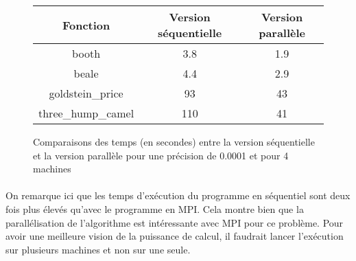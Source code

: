     \begin{figure}[!h]
        \begin{center}
            \begin{tabular}{|c|c|c|}
            \hline
                \textbf{Fonction} & \textbf{Version séquentielle} & \textbf{Version parallèle} \\ \hline
                booth & 3.8 & 1.9  \\ \hline
                beale & 4.4 &  2.9 \\ \hline
                goldstein\_price & 93 & 43 \\ \hline
                three\_hump\_camel & 110 & 41 \\ \hline
            \end{tabular}
            \caption{Comparaisons des temps (en secondes) entre la version séquentielle et la version parallèle pour une précision de 0.0001 et pour 4 machines}
            \label{tab:compare-mpi}
        \end{center}
    \end{figure}
    
    \FloatBarrier
    
    \paragraph{}
    
    On remarque ici que les temps d'exécution du programme en séquentiel sont deux fois plus élevés qu'avec le programme en MPI. Cela montre bien que la parallélisation de l'algorithme est intéressante avec MPI pour ce problème. Pour avoir une meilleure vision de la puissance de calcul, il faudrait lancer l'exécution sur plusieurs machines et non sur une seule.
